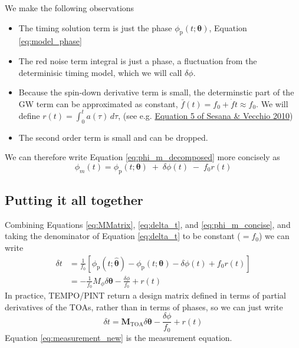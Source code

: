 \documentclass[]{scrartcl}
\begin{document}
We make the following observations
\begin{itemize}
	\item The timing solution term is just the phase 	$\phi_{\text{p}}(t;\boldsymbol{\theta})$, Equation \eqref{eq:model_phase}
	\item The red noise term integral is just a phase, a fluctuation from the determinisic timing model, which we will call $\delta \phi$.
	\item Because the spin-down derivative term is small, the determinstic part of the GW term can be approximated as constant, $\bar{f}(t) = f_0 + \dot{f} t \approx f_0$. We will define $r(t) =\int_{0}^{t} a(\tau) \,d\tau $, (see e.g. \href{https://arxiv.org/abs/1003.0677}{Equation 5 of Sesana \& Vecchio 2010})
	\item The second order term is small and can be dropped.
\end{itemize}
We can therefore write Equation \eqref{eq:phi_m_decomposed} more concisely as 
\begin{equation}
	\phi_m(t)
	= \phi_{\text{p}}(t;\boldsymbol{\theta})
	\;+\;
	\delta \phi(t)
	\;-\;
	f_0 r(t) \label{eq:phi_m_concise}
\end{equation}

\subsection{Putting it all together}
Combining Equations \eqref{eq:MMatrix}, \eqref{eq:delta_t}, and \eqref{eq:phi_m_concise}, and taking the denominator of Equation \eqref{eq:delta_t} to be constant ($=f_0$) we can write
\begin{align}
	\delta t &= \frac{1}{f_0} \left[ \phi_{\text{p}}(t;\boldsymbol{\hat{\theta}}) - \phi_{\text{p}}(t;\boldsymbol{\theta}) - \delta \phi(t) + f_0 r(t)\right] \\
	&= - \frac{1}{f_0}M_{\phi} \delta \boldsymbol{\theta} - \frac{\delta \phi}{f_0} + r(t)
\end{align}
In practice, TEMPO/PINT return a design matrix defined in terms of partial derivatives of the TOAs, rather than in terms of phases, so we can just write
\begin{equation}
	\boxed{\delta t = \boldsymbol{M}_{\text{TOA}} \delta \boldsymbol{\theta} - \frac{\delta \phi}{f_0} + r(t)} \label{eq:measurement_new}
\end{equation}
Equation \eqref{eq:measurement_new} is the measurement equation. \newline 
\end{document}
